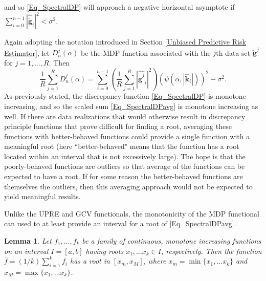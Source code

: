 \documentclass[12pt]{article}
\newcommand{\gnoise}{\widetilde{\mathbf{g}}}
\newcommand{\kdis}{\mathbf{k}}
\newcommand{\regparam}{\alpha}
\newcommand{\mfilt}{\psi}
\newcommand{\noiseSD}{\sigma}	%
\newcommand{\D}{D}	%
\newtheorem*{lemma}{Lemma}
\begin{document}
and so \eqref{Eq_SpectralDP} will approach a negative horizontal asymptote if $\sum_{i = 0}^{n-1} |\widehat{\gnoise}_i|^2 < \noiseSD^2$. \par 
Again adopting the notation introduced in Section \ref{Unbiased Predictive Risk Estimator}, let $\D_n^j(\regparam)$ be the MDP function associated with the $j$th data set $\gnoise^j$ for $j = 1,\ldots,R$. Then 
\begin{equation}
\frac{1}{R}\sum_{j=1}^R \D_n^j(\regparam)  = \sum_{i = 0}^{n-1} \left(\frac{1}{R} \sum_{j=1}^R |\widehat{\gnoise^j}_i|^2\right)(\mfilt(\regparam,|\widehat{\kdis}_i|))^2 - \noiseSD^2. 
\label{Eq_SpectralDPavg}
\end{equation}
As previously stated, the discrepancy function \eqref{Eq_SpectralDP} is monotone increasing, and so the scaled sum \eqref{Eq_SpectralDPavg} is monotone increasing as well. If there are data realizations that would otherwise result in discrepancy principle functions that prove difficult for finding a root, averaging these functions with better-behaved functions could provide a single function with a meaningful root (here ``better-behaved" means that the function has a root located within an interval that is not excessively large). The hope is that the poorly-behaved functions are outliers so that average of the functions can be expected to have a root. If for some reason the better-behaved functions are themselves the outliers, then this averaging approach would not be expected to yield meaningful results. \par 
Unlike the UPRE and GCV functionals, the monotonicity of the MDP functional can used to at least provide an interval for a root of \eqref{Eq_SpectralDPavg}. 
\begin{lemma}
Let $f_1,\ldots,f_k$ be a family of continuous, monotone increasing functions on an interval $I = [a,b]$ having roots $x_1,\ldots x_k \in I$, respectively. Then the function $\overline{f} = (1/k)\sum_{i=1}^k f_i$ has a root in $[x_m,x_M]$, where $x_m = \min\{x_1,\ldots x_k\}$ and $x_M = \max\{x_1,\ldots x_k\}$.
\end{lemma}
\end{document}
